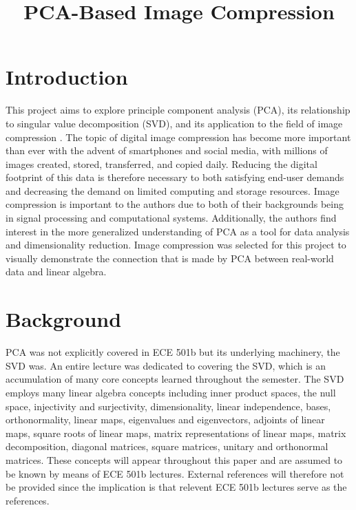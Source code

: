 \documentclass[conference]{IEEEtran}
\title{PCA-Based Image Compression}
\author{
\IEEEauthorblockN{Owen Sowatzke}
\IEEEauthorblockA{\textit{Electrical Engineering Department} \\
\textit{University of Arizona}\\
Tucson, USA \\
osowatzke@arizona.edu}
\and
\IEEEauthorblockN{Scott Thoesen}
\IEEEauthorblockA{\textit{Electrical Engineering Department} \\
\textit{University of Arizona}\\
Tucson, USA \\
thoesens@arizona.edu}}
\begin{document}
    
	\maketitle
	\begin{abstract}
	\end{abstract}

	\begin{IEEEkeywords}
	\end{IEEEkeywords}

    \section{Introduction}
    This project aims to explore principle component analysis (PCA), its relationship to singular value decomposition (SVD), and its application to the field of image compression \cite{jaradet_svd_image_compression}. The topic of digital image compression has become more important than ever with the advent of smartphones and social media, with millions of images created, stored, transferred, and copied daily. Reducing the digital footprint of this data is therefore necessary to both satisfying end-user demands and decreasing the demand on limited computing and storage resources. Image compression is important to the authors due to both of their backgrounds being in signal processing and computational systems. Additionally, the authors find interest in the more generalized understanding of PCA as a tool for data analysis and dimensionality reduction. Image compression was selected for this project to visually demonstrate the connection that is made by PCA between real-world data and linear algebra.

    \section{Background}
    PCA was not explicitly covered in ECE 501b but its underlying machinery, the SVD was. An entire lecture was dedicated to covering the SVD, which is an accumulation of many core concepts learned throughout the semester. The SVD employs many linear algebra concepts including inner product spaces, the null space, injectivity and surjectivity, dimensionality, linear independence, bases, orthonormality, linear maps, eigenvalues and eigenvectors, adjoints of linear maps, square roots of linear maps, matrix representations of linear maps, matrix decomposition, diagonal matrices, square matrices, unitary and orthonormal matrices. These concepts will appear throughout this paper and are assumed to be known by means of ECE 501b lectures. External references will therefore not be provided since the implication is that relevent ECE 501b lectures serve as the references.
\end{document}
